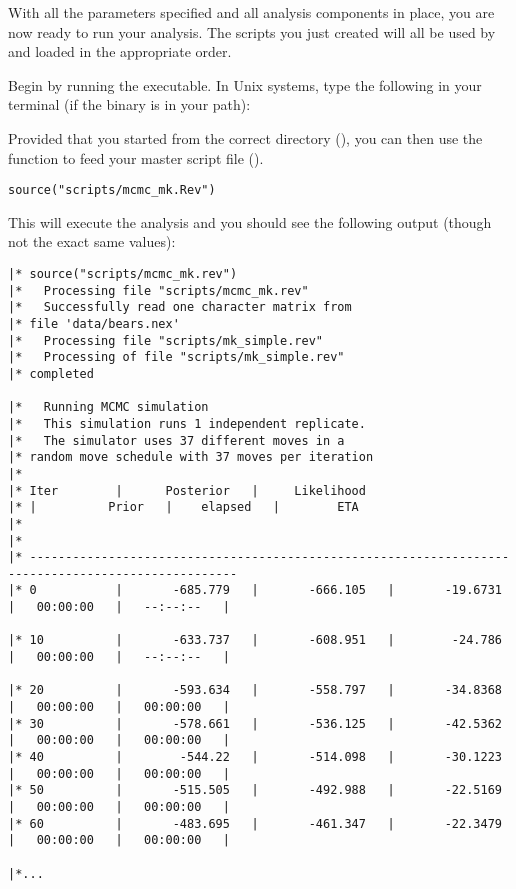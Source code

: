 With all the parameters specified and all analysis components in place, you are now ready to run your analysis. 
The \Rev scripts you just created will all be used by \RevBayes and loaded in the appropriate order.

{\begin{framed}
Begin by running the \RevBayes executable. In Unix systems, type the following in your terminal (if the \RevBayes binary is in your path):

\colorbox{black}{\strut\hspace{1mm}\textcolor[rgb]{0,1,1}{}\hspace{0.925\textwidth}}
\end{framed}}

Provided that you started \RevBayes from the correct directory (), you can then use the  function to feed \RevBayes your master script file ().
{\tt \begin{snugshade*}
\begin{lstlisting}
source("scripts/mcmc_mk.Rev")
\end{lstlisting}
\end{snugshade*}}

This will execute the analysis and you should see the following output (though not the exact same values):


{\tiny{\tt \begin{snugshade*}
\begin{lstlisting}
|* source("scripts/mcmc_mk.rev")
|*   Processing file "scripts/mcmc_mk.rev"
|*   Successfully read one character matrix from
|* file 'data/bears.nex'
|*   Processing file "scripts/mk_simple.rev"
|*   Processing of file "scripts/mk_simple.rev"
|* completed

|*   Running MCMC simulation
|*   This simulation runs 1 independent replicate.
|*   The simulator uses 37 different moves in a
|* random move schedule with 37 moves per iteration
|*
|* Iter        |      Posterior   |     Likelihood  
|* |          Prior   |    elapsed   |        ETA   
|*
|*
|* ---------------------------------------------------------------------------------------------------
|* 0           |       -685.779   |       -666.105   |       -19.6731   |   00:00:00   |   --:--:--   |

|* 10          |       -633.737   |       -608.951   |        -24.786   |   00:00:00   |   --:--:--   |

|* 20          |       -593.634   |       -558.797   |       -34.8368   |   00:00:00   |   00:00:00   |
|* 30          |       -578.661   |       -536.125   |       -42.5362   |   00:00:00   |   00:00:00   |
|* 40          |        -544.22   |       -514.098   |       -30.1223   |   00:00:00   |   00:00:00   |
|* 50          |       -515.505   |       -492.988   |       -22.5169   |   00:00:00   |   00:00:00   |
|* 60          |       -483.695   |       -461.347   |       -22.3479   |   00:00:00   |   00:00:00   |

|*...
\end{lstlisting}
\end{snugshade*}}}


